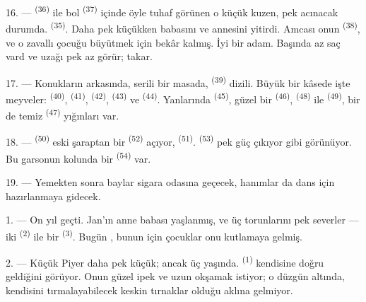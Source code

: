 16. ---  \textsuperscript{(36)} ile bol 
\textsuperscript{(37)} içinde öyle tuhaf görünen o küçük kuzen, pek acınacak
durumda.  \textsuperscript{(35)}. Daha pek küçükken babasını
ve annesini yitirdi. Amcası onun  \textsuperscript{(38)}, ve
o zavallı çocuğu büyütmek için bekâr kalmış. İyi bir adam. Başında az saç
vard ve uzağı pek az görür;  takar.

\VUsaut{2.4mm}
\VUsaut{3.0mm}

17. --- Konukların arkasında,  serili bir masada, 
\textsuperscript{(39)} dizili. Büyük bir kâsede işte meyveler:
 \textsuperscript{(40)},  \textsuperscript{(41)},
 \textsuperscript{(42)},  \textsuperscript{(43)} ve
 \textsuperscript{(44)}. Yanlarında 
\textsuperscript{(45)}, güzel bir  \textsuperscript{(46)},
 \textsuperscript{(48)} ile 
\textsuperscript{(49)}, bir de temiz  \textsuperscript{(47)}
yığınları var.

18. ---  \textsuperscript{(50)} eski şaraptan bir
 \textsuperscript{(52)} açıyor, 
\textsuperscript{(51)}.  \textsuperscript{(53)} pek güç
çıkıyor gibi görünüyor. Bu garsonun kolunda bir 
\textsuperscript{(54)} var.

19. --- Yemekten sonra baylar sigara odasına geçecek, hanımlar da dans için
hazırlanmaya gidecek.

\VUsaut{5.0mm}
\VUsaut{1.6mm}
\VUsaut{2.6mm}

\VUsaut{3.0mm}

1. --- On yıl geçti. Jan'ın anne babası yaşlanmış, ve üç torunlarını pek
severler — iki  \textsuperscript{(2)} ile bir
 \textsuperscript{(3)}. Bugün , bunun için çocuklar onu kutlamaya gelmiş.

2. --- Küçük Piyer daha pek küçük; ancak üç yaşında. 
\textsuperscript{(1)} kendisine doğru geldiğini görüyor. Onun güzel ipek
 ve uzun  okşamak istiyor; o düzgün
 altında, kendisini tırmalayabilecek keskin tırnaklar
olduğu aklına gelmiyor.

